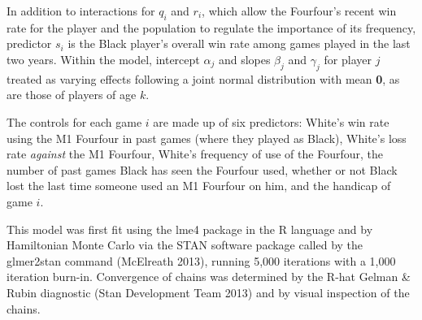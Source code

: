 \documentclass{article}
\begin{document}
In addition to interactions for $q_i$ and $r_i$, which allow the Fourfour's recent win rate for the player and the population to regulate the importance of its frequency, predictor $s_i$ is the Black player's overall win rate among games played in the last two years.  Within the model, intercept $\alpha_j$ and slopes $\beta_j$ and $\gamma_j$ for player $j$ treated as varying effects following a joint normal distribution with mean \textbf{0}, as are those of players of age $k$.

The controls for each game $i$ are made up of six predictors: White's win rate using the M1 Fourfour in past games (where they played as Black), White's loss rate \textit{against} the M1 Fourfour, White's frequency of use of the Fourfour, the number of past games Black has seen the Fourfour used, whether or not Black lost the last time someone used an M1 Fourfour on him, and the handicap of game $i$.

This model was first fit using the lme4 package in the R language and by Hamiltonian Monte Carlo via the STAN software package called by the glmer2stan command (McElreath 2013), running 5,000 iterations with a 1,000 iteration burn-in.  Convergence of chains was determined by the R-hat Gelman \& Rubin diagnostic (Stan Development Team 2013) and by visual inspection of the chains.
\end{document}

